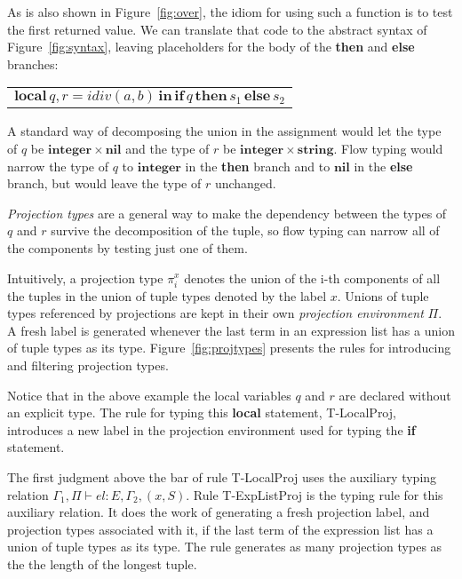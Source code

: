 \documentclass[10pt]{sigplanconf}
\newcommand{\Nil}{\mathbf{nil}}
\newcommand{\Integer}{\mathbf{integer}}
\newcommand{\String}{\mathbf{string}}
\newcommand{\env}{\Gamma}
\newcommand{\penv}{\Pi}
\begin{document}
As is also shown in Figure~\ref{fig:over}, the idiom for using such
a function is to test the first returned value. We
can translate that code to the abstract syntax of
Figure~\ref{fig:syntax}, leaving placeholders for
the body of the {\bf then} and {\bf else} branches:
{\footnotesize
\begin{center}
	\begin{tabular}{ll}
		\multicolumn{2}{l}{$\mathbf{local} \, q, r = idiv(a, b) \, \mathbf{in} \, \mathbf{if} \, q \, \mathbf{then} \, s_1 \, \mathbf{else} \, s_2$}
	\end{tabular}
\end{center}
}

A standard way of decomposing the union in the assignment
would let the type of $q$ be $\Integer \times \Nil$ and
the type of $r$ be $\Integer \times \String$. Flow typing
would narrow the type of $q$ to $\Integer$ in the {\bf then}
branch and to $\Nil$ in the {\bf else} branch, but would
leave the type of $r$ unchanged.

{\em Projection types}
are a general way to make the dependency between the types
of $q$ and $r$ survive the decomposition of the tuple,
so flow typing can narrow all of the components by testing
just one of them.

Intuitively, a projection type $\pi_{i}^{x}$ denotes the union of
the i-th components of all the tuples in the union of tuple types
denoted by the label $x$. Unions of tuple types referenced by projections are kept in their own {\em projection environment} $\Pi$. A fresh label is generated whenever the last term
in an expression list has a union of tuple types as its type.
Figure~\ref{fig:projtypes} presents the rules for introducing and filtering projection types.

Notice that in the above example the local variables $q$ and $r$ are declared without an explicit type. 
 The rule for typing this {\bf local} statement,
{\sc T-LocalProj}, introduces a new label in the projection
environment used for typing the {\bf if} statement.

The first judgment above the bar of rule {\sc T-LocalProj} uses the auxiliary typing relation $\env_{1}, \penv \vdash el : E, \env_{2}, (x,S)$. Rule {\sc T-ExpListProj} is the typing rule for this auxiliary
relation. It does the work of generating a fresh projection label,
and projection types associated with it, if the last term of
the expression list has a union of tuple types as its type.
The rule generates as many projection types as the the length
of the longest tuple.
\end{document}

